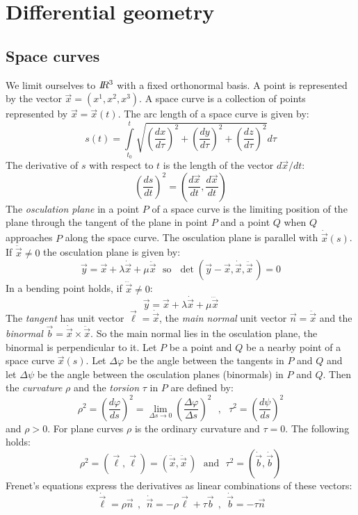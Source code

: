 \documentclass[a4paper,fancyheadings,twoside]{report}
\begin{document}
\section{Differential geometry}
\subsection{Space curves}
We limit ourselves to $I\hspace{-1mm}R^3$ with a fixed orthonormal basis. A point is
represented by the vector $\vec{x}=(x^1,x^2,x^3)$. A space curve is a
collection of points represented by $\vec{x}=\vec{x}(t)$. The arc length of a
space curve is given by:
\[
s(t)=\int\limits_{t_0}^t\sqrt{\left(\frac{dx}{d\tau}\right)^2+\left(\frac{dy}{d\tau}\right)^2+\left(\frac{dz}{d\tau}\right)^2}d\tau
\]
The derivative of $s$ with respect to $t$ is the length of the vector $d\vec{x}/dt$:
\[
\left(\frac{ds}{dt}\right)^2=\left(\frac{d\vec{x}}{dt},\frac{d\vec{x}}{dt}\right)
\]
The {\it osculation plane} in a point $P$ of a space curve is the limiting
position of the plane through the tangent of the plane in point $P$ and a point
$Q$ when $Q$ approaches $P$ along the space curve. The osculation plane is
parallel with $\dot{\vec{x}}(s)$. If $\ddot{\vec{x}}\neq0$ the osculation
plane is given by:
\[
\vec{y}=\vec{x}+\lambda\dot{\vec{x}}+\mu\ddot{\vec{x}}~~~\mbox{so}~~~
\det(\vec{y}-\vec{x},\dot{\vec{x}},\ddot{\vec{x}}\,)=0
\]
In a bending point holds, if $\dddot{\vec{x}}\neq0$:
\[
\vec{y}=\vec{x}+\lambda\dot{\vec{x}}+\mu\dddot{\vec{x}}
\]
The {\it tangent} has unit vector $\vec{\ell}=\dot{\vec{x}}$, the
{\it main normal} unit vector $\vec{n}=\ddot{\vec{x}}$ and the
{\it binormal} $\vec{b}=\dot{\vec{x}}\times\ddot{\vec{x}}$. So the main normal
lies in the osculation plane, the binormal is perpendicular to it.
\npar
Let $P$ be a point and $Q$ be a nearby point of a space curve $\vec{x}(s)$.
Let $\Delta\varphi$ be the angle between the tangents in $P$ and $Q$ and let
$\Delta\psi$ be the angle between the osculation planes (binormals) in $P$ and
$Q$. Then the {\it curvature} $\rho$ and the {\it torsion} $\tau$ in $P$ are
defined by:
\[
\rho^2=\left(\frac{d\varphi}{ds}\right)^2=\lim_{\Delta s\rightarrow0}\left(\frac{\Delta\varphi}{\Delta s}\right)^2~~~,~~~
\tau^2=\left(\frac{d\psi}{ds}\right)^2
\]
and $\rho>0$. For plane curves $\rho$ is the ordinary curvature and
$\tau=0$. The following holds:
\[
\rho^2=(\vec{\ell},\vec{\ell})=(\ddot{\vec{x}},\ddot{\vec{x}}\,)~~~\mbox{and}~~~
\tau^2=(\dot{\vec{b}},\dot{\vec{b}})
\]
Frenet's equations express the derivatives as linear combinations of these
vectors:
\[
\dot{\vec{\ell}}=\rho\vec{n}~~,~~\dot{\vec{n}}=-\rho\vec{\ell}+\tau\vec{b}~~,~~
\dot{\vec{b}}=-\tau\vec{n}
\]
\end{document}
